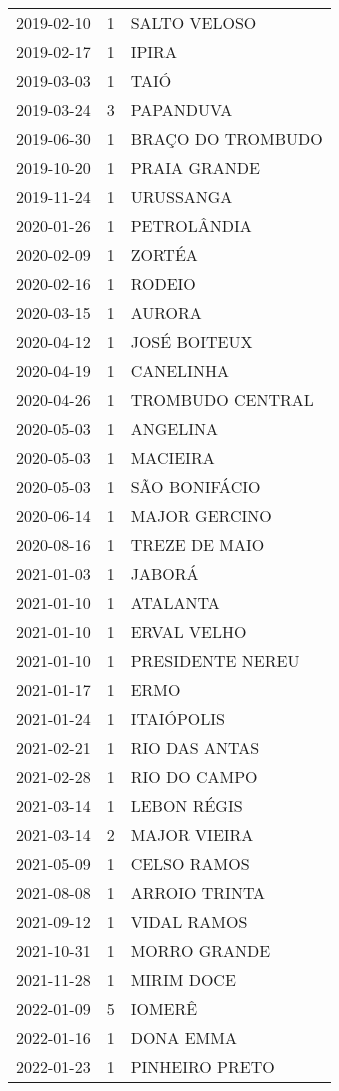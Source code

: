 \documentclass[
	12pt,				%
	openright,			%
	oneside,			%
	a4paper,			%
	english,			%
	french,				%
	spanish,			%
	brazil				%
	dvipsnames, table]{abntex2}
\begin{document}
\begin{longtable}[htbp]{ccl}
2019-02-10 & 1 & SALTO VELOSO \\
2019-02-17 & 1 & IPIRA \\
2019-03-03 & 1 & TAIÓ \\
2019-03-24 & 3 & PAPANDUVA \\
2019-06-30 & 1 & BRAÇO DO TROMBUDO \\
2019-10-20 & 1 & PRAIA GRANDE \\
2019-11-24 & 1 & URUSSANGA \\
2020-01-26 & 1 & PETROLÂNDIA \\
2020-02-09 & 1 & ZORTÉA \\
2020-02-16 & 1 & RODEIO \\
2020-03-15 & 1 & AURORA \\
2020-04-12 & 1 & JOSÉ BOITEUX \\
2020-04-19 & 1 & CANELINHA \\
2020-04-26 & 1 & TROMBUDO CENTRAL \\
2020-05-03 & 1 & ANGELINA \\
2020-05-03 & 1 & MACIEIRA \\
2020-05-03 & 1 & SÃO BONIFÁCIO \\
2020-06-14 & 1 & MAJOR GERCINO \\
2020-08-16 & 1 & TREZE DE MAIO \\
2021-01-03 & 1 & JABORÁ \\
2021-01-10 & 1 & ATALANTA \\
2021-01-10 & 1 & ERVAL VELHO \\
2021-01-10 & 1 & PRESIDENTE NEREU \\
2021-01-17 & 1 & ERMO \\
2021-01-24 & 1 & ITAIÓPOLIS \\
2021-02-21 & 1 & RIO DAS ANTAS \\
2021-02-28 & 1 & RIO DO CAMPO \\
2021-03-14 & 1 & LEBON RÉGIS \\
2021-03-14 & 2 & MAJOR VIEIRA \\
2021-05-09 & 1 & CELSO RAMOS \\
2021-08-08 & 1 & ARROIO TRINTA \\
2021-09-12 & 1 & VIDAL RAMOS \\
2021-10-31 & 1 & MORRO GRANDE \\
2021-11-28 & 1 & MIRIM DOCE \\
2022-01-09 & 5 & IOMERÊ \\
2022-01-16 & 1 & DONA EMMA \\
2022-01-23 & 1 & PINHEIRO PRETO \\

\end{longtable}
\end{document}
